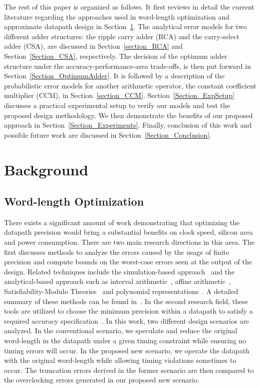 \documentclass[prodmode,acmtrets]{acmsmall} %
\begin{document}
The rest of this paper is organized as follows. It first reviews in detail the current literature regarding the approaches used in word-length optimization and approximate datapath design in Section~\ref{Section_Background}. The analytical error models for two different adder structures: the ripple carry adder (RCA) and the carry-select adder (CSA), are discussed in Section~\ref{section_RCA} and Section~\ref{Section_CSA}, respectively. The decision of the optimum adder structure under the accuracy-performance-area trade-offs, is then put forward in Section~\ref{Section_OptimumAdder}. It is followed by a description of the probabilistic error models for another arithmetic operator, the constant coefficient multiplier (CCM), in Section~\ref{section_CCM}. Section~\ref{Section_ExpSetup} discusses a practical experimental setup to verify our models and test the proposed design methodology. We then demonstrate the benefits of our proposed approach in Section~\ref{Section_Experiments}. Finally, conclusion of this work and possible future work are discussed in Section~\ref{Section_Conclusion}. 

\section{Background}\label{Section_Background}
\subsection{Word-length Optimization}\label{Section_Background_WL}
There exists a significant amount of work demonstrating that optimizing the datapath precision would bring a substantial benefits on clock speed, silicon area and power consumption. There are two main research directions in this area. The first discusses methods to analyze the errors caused by the usage of finite precision and compute bounds on the worst-case errors seen at the output of the design. Related techniques include the simulation-based approach~\cite{SungWLop_Simulation} and the analytical-based approach such as interval arithmetic~\cite{moore1966IA}, affine arithmetic~\cite{de2004affine}, Satisfiability-Modulo Theories~\cite{SAT2010} and polynomial representations~\cite{Boland2011TCAD}. A detailed summary of these methods can be found in~\cite{GeorgeDT11}. In the second research field, these tools are utilized to choose the minimum precision within a datapath to satisfy a required accuracy specification~\cite{RoldaoWLop_Simulation}. In this work, two different design scenarios are analyzed. In the conventional scenario, we speculate and reduce the original word-length in the datapath under a given timing constraint while ensuring no timing errors will occur. In the proposed new scenario, we operate the datapath with the original word-length while allowing timing violations sometimes to occur. The truncation errors derived in the former scenario are then compared to the overclocking errors generated in our proposed new scenario. 
\end{document}
